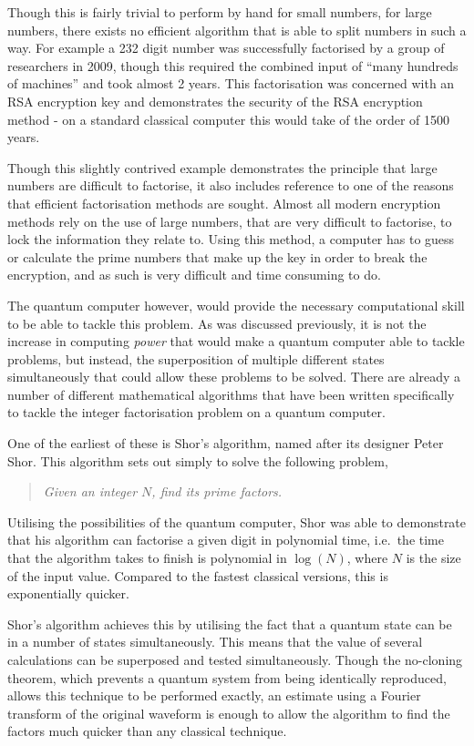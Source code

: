 Though this is fairly trivial to perform by hand for small numbers, for large numbers, there exists no efficient algorithm that is able to split numbers in such a way. For example a 232 digit number was successfully factorised by a group of researchers in 2009, though this required the combined input of ``many hundreds of machines'' and took almost 2 years\cite{Kleinjung}. This factorisation was concerned with an RSA encryption key and demonstrates the security of the RSA encryption method - on a standard classical computer this would take of the order of 1500\,years.

Though this slightly contrived example demonstrates the principle that large numbers are difficult to factorise, it also includes reference to one of the reasons that efficient factorisation methods are sought. Almost all modern encryption methods rely on the use of large numbers, that are very difficult to factorise, to lock the information they relate to. Using this method, a computer has to guess or calculate the prime numbers that make up the key in order to break the encryption, and as such is very difficult and time consuming to do. 

The quantum computer however, would provide the necessary computational skill to be able to tackle this problem. As was discussed previously, it is not the increase in computing \emph{power} that would make a quantum computer able to tackle problems, but instead, the superposition of multiple different states simultaneously that could allow these problems to be solved. There are already a number of different mathematical algorithms that have been written specifically to tackle the integer factorisation problem on a quantum computer. 

One of the earliest of these is Shor's algorithm, named after its designer Peter Shor\cite{shor1994algorithms}. This algorithm sets out simply to solve the following problem,
\begin{quote}
	\emph{Given an integer $N$, find its prime factors.}
\end{quote}
Utilising the possibilities of the quantum computer, Shor was able to demonstrate that his algorithm can factorise a given digit in polynomial time\cite{shor1994algorithms}, i.e.\ the time that the algorithm takes to finish is polynomial in $\log(N)$, where $N$ is the size of the input value. Compared to the fastest classical versions, this is exponentially quicker.

Shor's algorithm achieves this by utilising the fact that a quantum state can be in a number of states simultaneously. This means that the value of several calculations can be superposed and tested simultaneously. Though the no-cloning theorem, which prevents a quantum system from being identically reproduced\cite{no-cloning}, allows this technique to be performed exactly, an estimate using a Fourier transform of the original waveform is enough to allow the algorithm to find the factors much quicker than any classical technique.

